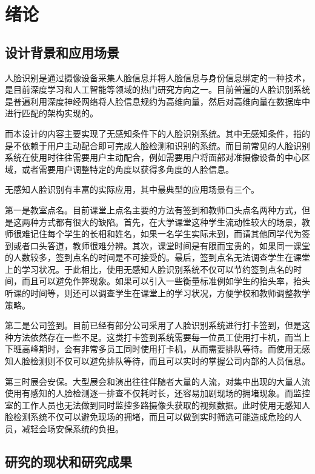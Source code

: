\chapter{绪论}

\section{设计背景和应用场景}

人脸识别是通过摄像设备采集人脸信息并将人脸信息与身份信息绑定的一种技术，是目前深度学习和人工智能等领域的热门研究方向之一。目前普遍的人脸识别系统是普遍利用深度神经网络将人脸信息规约为高维向量，然后对高维向量在数据库中进行匹配的架构实现的。

而本设计的内容主要实现了无感知条件下的人脸识别系统。其中无感知条件，指的是不依赖于用户主动配合即可完成人脸检测和识别的系统。而目前常见的人脸识别系统在使用时往往需要用户主动配合，例如需要用户将面部对准摄像设备的中心区域，或者需要用户调整特定的角度以获得多角度的人脸信息。

无感知人脸识别有丰富的实际应用，其中最典型的应用场景有三个。

第一是教室点名。目前课堂上点名主要的方法有签到和教师口头点名两种方式，但是这两种方式都有很大的缺陷。首先，在大学课堂这种学生流动性较大的场景，教师很难记住每个学生的长相和姓名，如果一名学生实际未到，而请其他同学代为签到或者口头答道，教师很难分辨。其次，课堂时间是有限而宝贵的，如果同一课堂的人数较多，签到点名的时间是不可接受的。最后，签到点名无法调查学生在课堂上的学习状况。于此相比，使用无感知人脸识别系统不仅可以节约签到点名的时间，而且可以避免作弊现象。如果可以引入一些衡量标准例如学生的抬头率，抬头听课的时间等，则还可以调查学生在课堂上的学习状况，方便学校和教师调整教学策略。

第二是公司签到。目前已经有部分公司采用了人脸识别系统进行打卡签到，但是这种方法依然存在一些不足。这类打卡签到系统需要每一位员工使用打卡机，而当上下班高峰期时，会有非常多员工同时使用打卡机，从而需要排队等待。而使用无感知人脸检测则不仅可以避免排队等待，而且可以实时的掌握公司内部的人员信息。

第三时展会安保。大型展会和演出往往伴随者大量的人流，对集中出现的大量人流使用有感知的人脸检测逐一排查不仅耗时长，还容易加剧现场的拥堵现象。而监控室的工作人员也无法做到同时监控多路摄像头获取的视频数据。此时使用无感知人脸检测系统不仅可以避免现场的拥堵，而且可以做到实时筛选可能造成危险的人员，减轻会场安保系统的负担。

\section{研究的现状和研究成果}


